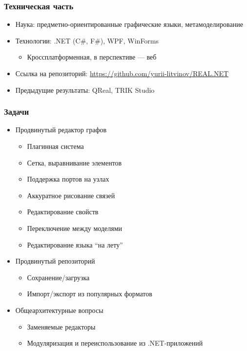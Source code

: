 \documentclass[xetex,mathserif,serif]{beamer}
\begin{document}
	\begin{frame}
		\frametitle{Техническая часть}
		\begin{itemize}
			\item Наука: предметно-ориентированные графические языки, метамоделирование
			\item Технологии: .NET (C\#, F\#), WPF, WinForms
			\begin{itemize}
				\item Кроссплатформенная, в перспективе --- веб
			\end{itemize}
			\item Ссылка на репозиторий: \url{https://github.com/yurii-litvinov/REAL.NET}
			\item Предыдущие результаты: QReal, TRIK Studio
		\end{itemize}
	\end{frame}

	\begin{frame}
		\frametitle{Задачи}
		\begin{itemize}
			\item Продвинутый редактор графов
			\begin{itemize}
				\item Плагинная система
				\item Сетка, выравнивание элементов
				\item Поддержка портов на узлах
				\item Аккуратное рисование связей
				\item Редактирование свойств
				\item Переключение между моделями
				\item Редактирование языка ``на лету''
			\end{itemize}
			\item Продвинутый репозиторий
			\begin{itemize}
				\item Сохранение/загрузка
				\item Импорт/экспорт из популярных форматов
			\end{itemize}
			\item Общеархитектурные вопросы
			\begin{itemize}
				\item Заменяемые редакторы
				\item Модуляризация и переиспользование из .NET-приложений
			\end{itemize}
		\end{itemize}
	\end{frame}
\end{document}
